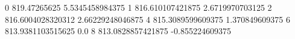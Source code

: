 0 819.47265625 5.5345458984375
1 816.610107421875 2.6719970703125
2 816.6004028320312 2.66229248046875
4 815.3089599609375 1.370849609375
6 813.9381103515625 0.0
8 813.0828857421875 -0.855224609375
